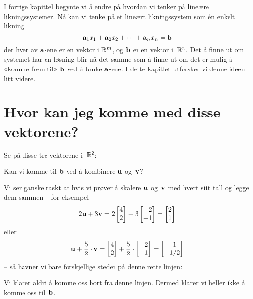 

\label{ch:linearkombinasjoner}

I forrige kapittel begynte vi å endre på hvordan vi tenker på lineære
likningssystemer.  Nå kan vi tenke på et lineært likningssystem som én
enkelt likning
\[
\mathbf{a}_1 x_1 + \mathbf{a}_2 x_2 + \cdots + \mathbf{a}_n x_n = \mathbf{b}
\]
der hver av $\mathbf{a}$-ene er en vektor i $\mathbb{R}^m$, og $\mathbf{b}$ er en vektor
i~$\mathbb{R}^n$.  Det å finne ut om systemet har en løsning blir nå det samme
som å finne ut om det er mulig å «komme frem til» $\mathbf{b}$ ved å bruke
$\mathbf{a}$-ene.
I dette kapitlet utforsker vi denne ideen litt videre.



\section*{Hvor kan jeg komme med disse vektorene?}

Se på disse tre vektorene i~$\mathbb{R}^2$:
\begin{center}
\end{center}
Kan vi komme til $\mathbf{b}$ ved å kombinere $\mathbf{u}$ og~$\mathbf{v}$?

Vi ser ganske raskt at hvis vi prøver å skalere $\mathbf{u}$ og~$\mathbf{v}$ med hvert
sitt tall og legge dem sammen -- for eksempel
\[
2\mathbf{u} + 3\mathbf{v}
= 2 \begin{bmatrix} 4 \\ 2 \end{bmatrix} + 3 \begin{bmatrix} -2 \\ -1 \end{bmatrix}
= \begin{bmatrix} 2 \\ 1 \end{bmatrix}
\]
eller
\[
\mathbf{u} + \frac{5}{2} \cdot \mathbf{v}
= \begin{bmatrix} 4 \\ 2 \end{bmatrix} + \frac{5}{2} \cdot \begin{bmatrix} -2 \\ -1 \end{bmatrix}
= \begin{bmatrix} -1 \\ -1/2 \end{bmatrix}
\]
-- så havner vi bare forskjellige steder på denne rette linjen:
\begin{center}
\end{center}
Vi klarer aldri å komme oss bort fra denne linjen.  Dermed klarer vi
heller ikke å komme oss til~$\mathbf{b}$.


